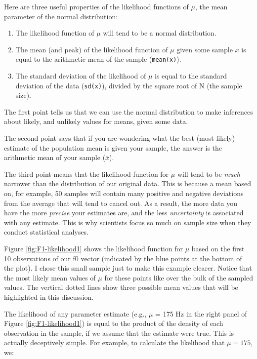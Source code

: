 \documentclass[
]{book}
\begin{document}
Here are three useful properties of the likelihood functions of \(\mu\), the mean parameter of the normal distribution:

\begin{enumerate}
\def\labelenumi{\arabic{enumi}.}
\item
  The likelihood function of \(\mu\) will tend to be a normal distribution.
\item
  The mean (and peak) of the likelihood function of \(\mu\) given some sample \(x\) is equal to the arithmetic mean of the sample (\texttt{mean(x)}).
\item
  The standard deviation of the likelihood of \(\mu\) is equal to the standard deviation of the data (\texttt{sd(x)}), divided by the square root of N (the sample size).
\end{enumerate}

The first point tells us that we can use the normal distribution to make inferences about likely, and unlikely values for means, given some data.

The second point says that if you are wondering what the best (most likely) estimate of the population mean is given your sample, the answer is the arithmetic mean of your sample (\(\bar{x}\)).

The third point means that the likelihood function for \(\mu\) will tend to be \emph{much} narrower than the distribution of our original data. This is because a mean based on, for example, 50 samples will contain many positive and negative deviations from the average that will tend to cancel out. As a result, the more data you have the more \emph{precise} your estimates are, and the less \emph{uncertainty} is associated with any estimate. This is why scientists focus so much on sample size when they conduct statistical analyses.

Figure \ref{fig:F1-likelihood1} shows the likelihood function for \(\mu\) based on the first 10 observations of our f0 vector (indicated by the blue points at the bottom of the plot). I chose this small sample just to make this example clearer. Notice that the most likely mean values of \(\mu\) for these points like over the bulk of the sampled values. The vertical dotted lines show three possible mean values that will be highlighted in this discussion.

The likelihood of any parameter estimate (e.g., \(\mu\) = 175 Hz in the right panel of Figure \ref{fig:F1-likelihood1}) is equal to the product of the density of each observation in the sample, if we assume that the estimate were true. This is actually deceptively simple. For example, to calculate the likelihood that \(\mu=175\), we:
\end{document}

